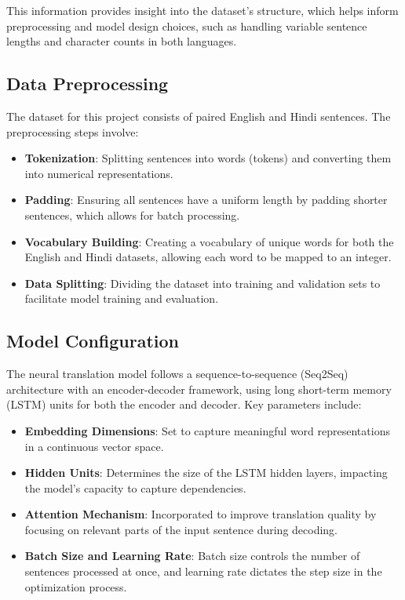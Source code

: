 \documentclass[12pt]{article}
\begin{document}
This information provides insight into the dataset's structure, which helps inform preprocessing and model design choices, such as handling variable sentence lengths and character counts in both languages.


\subsection{Data Preprocessing}
The dataset for this project consists of paired English and Hindi sentences. The preprocessing steps involve:
\begin{itemize}
    \item \textbf{Tokenization}: Splitting sentences into words (tokens) and converting them into numerical representations.
    \item \textbf{Padding}: Ensuring all sentences have a uniform length by padding shorter sentences, which allows for batch processing.
    \item \textbf{Vocabulary Building}: Creating a vocabulary of unique words for both the English and Hindi datasets, allowing each word to be mapped to an integer.
    \item \textbf{Data Splitting}: Dividing the dataset into training and validation sets to facilitate model training and evaluation.
\end{itemize}

\subsection{Model Configuration}
The neural translation model follows a sequence-to-sequence (Seq2Seq) architecture with an encoder-decoder framework, using long short-term memory (LSTM) units for both the encoder and decoder. Key parameters include:
\begin{itemize}
    \item \textbf{Embedding Dimensions}: Set to capture meaningful word representations in a continuous vector space.
    \item \textbf{Hidden Units}: Determines the size of the LSTM hidden layers, impacting the model’s capacity to capture dependencies.
    \item \textbf{Attention Mechanism}: Incorporated to improve translation quality by focusing on relevant parts of the input sentence during decoding.
    \item \textbf{Batch Size and Learning Rate}: Batch size controls the number of sentences processed at once, and learning rate dictates the step size in the optimization process.
\end{itemize}
\end{document}
